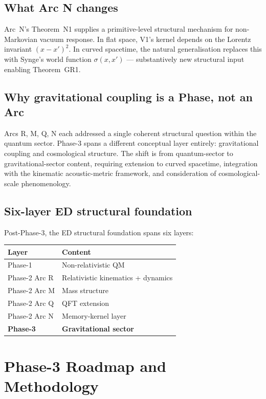 \documentclass[11pt,a4paper]{article}
\begin{document}
\subsection{What Arc N changes}

Arc~N's Theorem~N1 supplies a primitive-level structural mechanism for non-Markovian vacuum response. In flat space, V1's kernel depends on the Lorentz invariant $(x - x')^2$. In curved spacetime, the natural generalisation replaces this with Synge's world function $\sigma(x, x')$ --- substantively new structural input enabling Theorem~GR1.

\subsection{Why gravitational coupling is a Phase, not an Arc}

Arcs R, M, Q, N each addressed a single coherent structural question within the quantum sector. Phase-3 spans a different conceptual layer entirely: gravitational coupling and cosmological structure. The shift is from quantum-sector to gravitational-sector content, requiring extension to curved spacetime, integration with the kinematic acoustic-metric framework, and consideration of cosmological-scale phenomenology.

\subsection{Six-layer ED structural foundation}

Post-Phase-3, the ED structural foundation spans six layers:
\begin{center}
\begin{tabular}{ll}
\hline
Layer & Content \\
\hline
Phase-1 & Non-relativistic QM \\
Phase-2 Arc R & Relativistic kinematics + dynamics \\
Phase-2 Arc M & Mass structure \\
Phase-2 Arc Q & QFT extension \\
Phase-2 Arc N & Memory-kernel layer \\
\textbf{Phase-3} & \textbf{Gravitational sector} \\
\hline
\end{tabular}
\end{center}

\section{Phase-3 Roadmap and Methodology}
\end{document}
